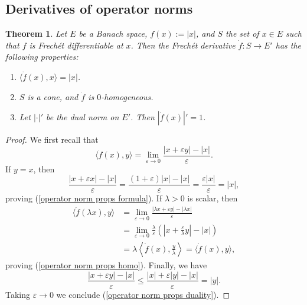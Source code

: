 \documentclass[reqno,11pt]{amsart}
\newtheorem{theorem}{Theorem}[section]
\theoremstyle{definition}
\numberwithin{equation}{section}
\begin{document}
\subsection{Derivatives of operator norms}
\begin{theorem}
Let $E$ be a Banach space, $f(x) := |x|$, and $S$ the set of $x \in E$ such that $f$ is Frech\'et differentiable at $x$.
Then the Frech\'et derivative $\dot f: S \to E'$ has the following properties:
\begin{enumerate}
\item $\langle \dot f(x), x\rangle = |x|$. \label{operator norm props formula}
\item $S$ is a cone, and $\dot f$ is $0$-homogeneous. \label{operator norm props homo}
\item Let $|\cdot|'$ be the dual norm on $E'$. Then $|\dot f(x)|' = 1$. \label{operator norm props duality}
\end{enumerate}
\end{theorem}
\begin{proof}
We first recall that
$$\langle \dot f(x), y\rangle = \lim_{\varepsilon \to 0} \frac{|x + \varepsilon y| - |x|}{\varepsilon}.$$
If $y = x$, then
$$\frac{|x + \varepsilon x| - |x|}{\varepsilon} = \frac{(1 + \varepsilon)|x| - |x|}{\varepsilon} = \frac{\varepsilon |x|}{\varepsilon} = |x|,$$
proving (\ref{operator norm props formula}).
If $\lambda > 0$ is scalar, then
\begin{align*}
\langle \dot f(\lambda x), y\rangle
&= \lim_{\varepsilon \to 0} \frac{|\lambda x + \varepsilon y| - |\lambda x|}{\varepsilon} \\
&= \lim_{\varepsilon \to 0} \frac{\lambda}{\varepsilon} \left(\left|x + \frac{\varepsilon}{\lambda} y\right| - |x|\right) \\
&= \lambda \left\langle \dot f(x), \frac{y}{\lambda}\right\rangle = \langle \dot f(x), y\rangle,
\end{align*}
proving (\ref{operator norm props homo}).
Finally, we have 
$$\frac{|x + \varepsilon y| - |x|}{\varepsilon} \leq \frac{|x| + \varepsilon |y| - |x|}{\varepsilon} = |y|.$$
Taking $\varepsilon \to 0$ we conclude (\ref{operator norm props duality}).
\end{proof}
\end{document}
